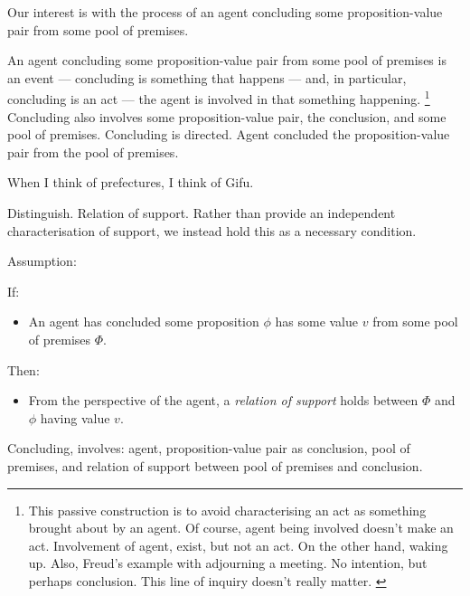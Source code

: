 \begin{note}
  Our interest is with the process of an agent concluding some proposition-value pair from some pool of premises.

  An agent concluding some proposition-value pair from some pool of premises is an event --- concluding is something that happens --- and, in particular, concluding is an act --- the agent is involved in that something happening.%
  \footnote{
    This passive construction is to avoid characterising an act as something brought about by an agent.
    Of course, agent being involved doesn't make an act.
    Involvement of agent, exist, but not an act.
    On the other hand, waking up.
    {
      \color{red}
      Also, Freud's example with adjourning a meeting.
      No intention, but perhaps conclusion.
    }
    {
      \color{red} This line of inquiry doesn't really matter.
    }
  }
  Concluding also involves some proposition-value pair, the conclusion, and some pool of premises.
  Concluding is directed.
  Agent concluded the proposition-value pair from the pool of premises.

  When I think of prefectures, I think of Gifu.

  Distinguish.
  Relation of support.
  Rather than provide an independent characterisation of support, we instead hold this as a necessary condition.

  Assumption:

  \begin{assumption}[Support]
    \label{assumption:support}
    If:
    \begin{itemize}
    \item
      An agent has concluded some proposition \(\phi\) has some value \(v\) from some pool of premises \(\Phi\).
    \end{itemize}
    Then:
    \begin{itemize}
    \item
      From the perspective of the agent, a \emph{relation of support} holds between \(\Phi\) and \(\phi\) having value \(v\).
    \end{itemize}
    \vspace{-\baselineskip}
  \end{assumption}

  Concluding, involves: agent, proposition-value pair as conclusion, pool of premises, and relation of support between pool of premises and conclusion.
\end{note}

